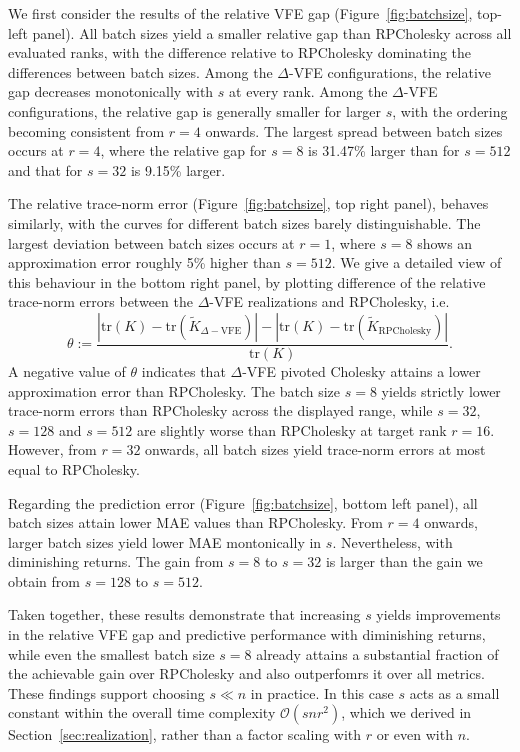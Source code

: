 \documentclass[onefignum,onetabnum]{siamart250211}
\newcommand{\tr}{\mathrm{tr}}
\begin{document}
We first consider the results of the relative VFE gap (Figure~\ref{fig:batchsize}, top-left panel). All batch sizes yield a smaller relative gap than RPCholesky across all evaluated ranks, with the difference relative to RPCholesky dominating the differences between batch sizes. Among the $\Delta$-VFE configurations, the relative gap decreases monotonically with $s$ at every rank. Among the $\Delta$-VFE configurations, the relative gap is generally smaller for larger $s$, with the ordering becoming consistent from $r=4$ onwards. The largest spread between batch sizes occurs at $r=4$, where the relative gap for $s=8$ is 31.47\% larger than for $s=512$ and that for $s=32$ is 9.15\% larger.

The relative trace-norm error (Figure~\ref{fig:batchsize}, top right panel), behaves similarly, with the curves for different batch sizes barely distinguishable. The largest deviation between batch sizes occurs at $r=1$, where $s=8$ shows an approximation error roughly 5\% higher than $s=512$. We give a detailed view of this behaviour in the bottom right panel, by plotting difference of the relative trace-norm errors  between the $\Delta$-VFE realizations and RPCholesky, i.e.
\begin{equation*}
    \theta := \frac{|\tr(K)-\tr(\widetilde{K}_{\Delta-\text{VFE}})|-|\tr(K)-\tr(\widetilde{K}_{\text{RPCholesky}})|}{\tr(K)}.
\end{equation*}
A negative value of $\theta$ indicates that $\Delta$-VFE pivoted Cholesky attains a lower approximation error than RPCholesky. The batch size $s=8$ yields strictly lower trace-norm errors than RPCholesky across the displayed range, while $s=32$, $s=128$ and $s=512$ are slightly worse than RPCholesky at target rank $r=16$. However, from $r=32$ onwards, all batch sizes yield trace-norm errors at most equal to RPCholesky.

Regarding the prediction error (Figure~\ref{fig:batchsize}, bottom left panel), all batch sizes attain lower MAE values than RPCholesky. From $r=4$ onwards, larger batch sizes yield lower MAE montonically in $s$. Nevertheless, with diminishing returns. The gain from $s=8$ to $s=32$ is larger than the gain we obtain from $s=128$ to $s=512$.

Taken together, these results demonstrate that increasing $s$ yields improvements in the relative VFE gap and predictive performance with diminishing returns, while even the smallest batch size $s=8$ already attains a substantial fraction of the achievable gain over RPCholesky and also outperfomrs it over all metrics. These findings support choosing $s\ll n$ in practice. In this case $s$ acts as a small constant within the overall time complexity $\mathcal{O}(snr^2)$, which we derived in Section~\ref{sec:realization}, rather than a factor scaling with $r$ or even with $n$.
\end{document}
